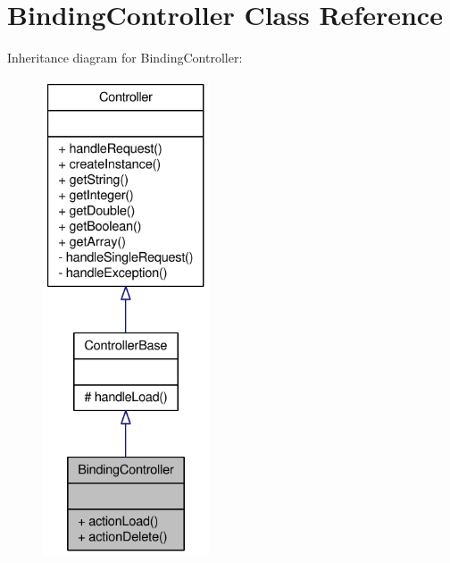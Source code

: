 \hypertarget{classBindingController}{
\section{BindingController Class Reference}
\label{classBindingController}
}


Inheritance diagram for BindingController:\nopagebreak
\begin{figure}[H]
\begin{center}
\leavevmode
\includegraphics[height=400pt]{classBindingController__inherit__graph}
\end{center}
\end{figure}


